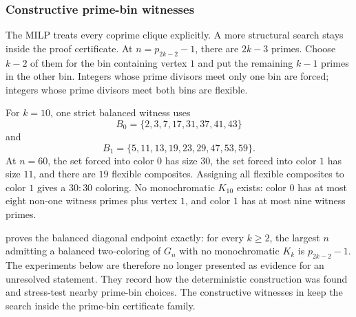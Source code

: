 \documentclass[11pt]{article}
\theoremstyle{plain}
\theoremstyle{definition}
\theoremstyle{remark}
\begin{document}
\subsubsection{Constructive prime-bin witnesses}

The MILP treats every coprime clique explicitly.  A more structural search
stays inside the proof certificate.  At $n=p_{2k-2}-1$, there are $2k-3$
primes.  Choose $k-2$ of them for the bin containing vertex $1$ and put the
remaining $k-1$ primes in the other bin.  Integers whose prime divisors meet
only one bin are forced; integers whose prime divisors meet both bins are
flexible.

For $k=10$, one strict balanced witness uses
\[
  B_0=\{2,3,7,17,31,37,41,43\}
\]
and
\[
  B_1=\{5,11,13,19,23,29,47,53,59\}.
\]
At $n=60$, the set forced into color $0$ has size $30$, the set forced into
color $1$ has size $11$, and there are $19$ flexible composites.  Assigning
all flexible composites to color $1$ gives a $30{:}30$ coloring.  No
monochromatic $K_{10}$ exists: color $0$ has at most eight non-one witness
primes plus vertex $1$, and color $1$ has at most nine witness primes.

 proves the balanced diagonal endpoint exactly:
for every $k\ge2$, the largest $n$ admitting a balanced two-coloring of
$G_n$ with no monochromatic $K_k$ is $p_{2k-2}-1$.  The experiments below are
therefore no longer presented as evidence for an unresolved statement.  They
record how the deterministic construction was found and stress-test nearby
prime-bin choices.  The constructive witnesses in
 keep the search inside
the prime-bin certificate family.
\end{document}

